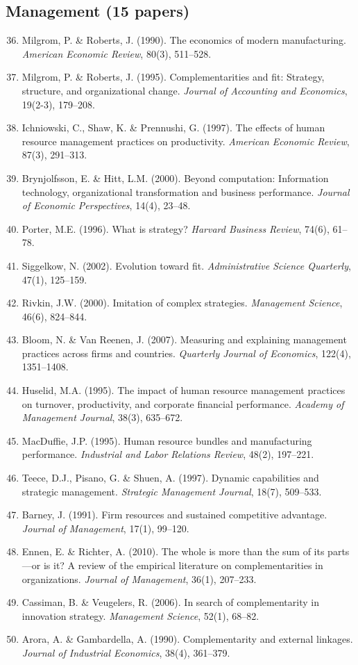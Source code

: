 \subsection{Management (15 papers)}

\begin{enumerate}
    \setcounter{enumi}{35}
    \item Milgrom, P. \& Roberts, J. (1990). The economics of modern manufacturing. \textit{American Economic Review}, 80(3), 511--528.
    \item Milgrom, P. \& Roberts, J. (1995). Complementarities and fit: Strategy, structure, and organizational change. \textit{Journal of Accounting and Economics}, 19(2-3), 179--208.
    \item Ichniowski, C., Shaw, K. \& Prennushi, G. (1997). The effects of human resource management practices on productivity. \textit{American Economic Review}, 87(3), 291--313.
    \item Brynjolfsson, E. \& Hitt, L.M. (2000). Beyond computation: Information technology, organizational transformation and business performance. \textit{Journal of Economic Perspectives}, 14(4), 23--48.
    \item Porter, M.E. (1996). What is strategy? \textit{Harvard Business Review}, 74(6), 61--78.
    \item Siggelkow, N. (2002). Evolution toward fit. \textit{Administrative Science Quarterly}, 47(1), 125--159.
    \item Rivkin, J.W. (2000). Imitation of complex strategies. \textit{Management Science}, 46(6), 824--844.
    \item Bloom, N. \& Van Reenen, J. (2007). Measuring and explaining management practices across firms and countries. \textit{Quarterly Journal of Economics}, 122(4), 1351--1408.
    \item Huselid, M.A. (1995). The impact of human resource management practices on turnover, productivity, and corporate financial performance. \textit{Academy of Management Journal}, 38(3), 635--672.
    \item MacDuffie, J.P. (1995). Human resource bundles and manufacturing performance. \textit{Industrial and Labor Relations Review}, 48(2), 197--221.
    \item Teece, D.J., Pisano, G. \& Shuen, A. (1997). Dynamic capabilities and strategic management. \textit{Strategic Management Journal}, 18(7), 509--533.
    \item Barney, J. (1991). Firm resources and sustained competitive advantage. \textit{Journal of Management}, 17(1), 99--120.
    \item Ennen, E. \& Richter, A. (2010). The whole is more than the sum of its parts—or is it? A review of the empirical literature on complementarities in organizations. \textit{Journal of Management}, 36(1), 207--233.
    \item Cassiman, B. \& Veugelers, R. (2006). In search of complementarity in innovation strategy. \textit{Management Science}, 52(1), 68--82.
    \item Arora, A. \& Gambardella, A. (1990). Complementarity and external linkages. \textit{Journal of Industrial Economics}, 38(4), 361--379.
\end{enumerate}

